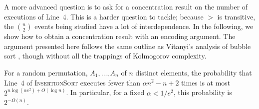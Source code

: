 \documentclass{patmorin}
\begin{document}
A more advanced question is to ask for a concentration result on the
number of executions of Line~4. This is a harder question to tackle;
because $>$ is transitive, the $\binom{n}{2}$ events being studied have
a lot of interdependence. In the following, we show how to obtain a
concentration result with an encoding argument.  The argument presented
here follows the same outline as Vitanyi's analysis of bubble sort
\cite{vitanyi:analysis}, though without all the trappings of Kolmogorov complexity.

\begin{thm}
  For a random permutation, $A_1,\ldots,A_n$ of $n$ distinct elements,
  the probability that Line~4 of \textsc{InsertionSort} executes fewer
  than $\alpha n^2 - n + 2$ times is at most $2^{n\log(\alpha e^2)+O(\log
  n)}$.  In particular, for a fixed $\alpha < 1/e^2$, this probability
  is $2^{-\Omega(n)}$.
\end{thm}
\end{document}
